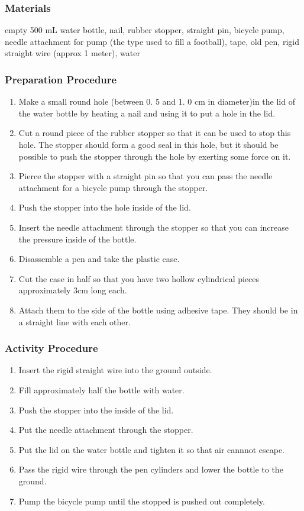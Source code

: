 \subsubsection*{Materials}
empty 500 mL water bottle, nail, rubber stopper, straight pin, bicycle pump, needle attachment for pump (the type used to fill a football), tape, old pen, rigid straight wire (approx 1 meter), water

\subsubsection*{Preparation Procedure}
\begin{enumerate}
\item{Make a small round hole (between 0.  5 and 1.  0 cm in diameter)in the lid of the water bottle by heating a nail and using it to put a hole in the lid.}
\item{Cut a round piece of the rubber stopper so that it can be used to stop this hole. The stopper should form a good seal in this hole, but it should be possible to push the stopper through the hole by exerting some force on it.}
\item{Pierce the stopper with a straight pin so that you can pass the needle attachment for a bicycle pump through the stopper.}
\item{Push the stopper into the hole inside of the lid.}
\item{Insert the needle attachment through the stopper so that you can increase the pressure inside of the bottle.}
\item{Disassemble a pen and take the plastic case.}
\item{Cut the case in half so that you have two hollow cylindrical pieces approximately 3cm long each.}
\item{Attach them to the side of the bottle using adhesive tape. They should be in a straight line with each other.}
\end{enumerate}

\subsubsection*{Activity Procedure}
\begin{enumerate}
\item{Insert the rigid straight wire into the ground outside.}
\item{Fill approximately half the bottle with water.}
\item{Push the stopper into the inside of the lid.}
\item{Put the needle attachment through the stopper.}
\item{Put the lid on the water bottle and tighten it so that air cannnot escape.}
\item{Pass the rigid wire through the pen cylinders and lower the bottle to the ground.}\item{Pump the bicycle pump until the stopped is pushed out completely.}
\end{enumerate}

